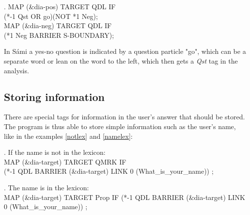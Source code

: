 \documentclass[11pt]{article}
\begin{document}
\ex.\flushleft\label{afforneg} \small{MAP (\&dia-pos) TARGET QDL IF \\ (*-1 Qst OR go)(NOT *1 Neg); \\
MAP (\&dia-neg) TARGET QDL IF \\(*1 Neg BARRIER S-BOUNDARY);} 

In Sámi a yes-no question is indicated by a question particle "go", which can be a separate word or lean on the word to the left, which then gets a \textit{Qst} tag in the analysis.
 
 


\subsection{Storing information}
There are special tags for information in the user's answer that should be stored. The program is thus able to store simple information such as the user's name, like in the examples \ref{notlex} and \ref{namelex}: 

\ex.\flushleft\label{notlex} \small{If the name is not in the lexicon: \\
MAP (\&dia-target) TARGET QMRK IF \\(*-1 QDL BARRIER (\&dia-target) LINK 0 (What\_is\_your\_name)) ;}

\ex.\flushleft\label{namelex} \small{The name is in the lexicon: \\
MAP (\&dia-target) TARGET Prop IF (*-1 QDL BARRIER (\&dia-target) LINK 0 (What\_is\_your\_name)) ;}
\end{document}
